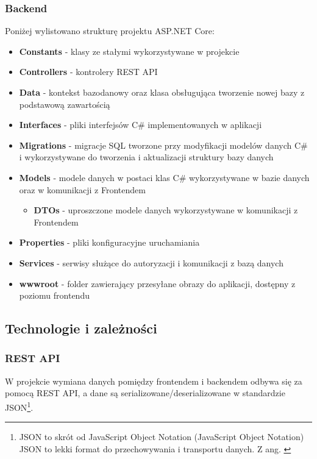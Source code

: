 \subsubsection{Backend}
Poniżej wylistowano strukturę projektu ASP.NET Core:
\begin{itemize}
	\item \textbf{Constants} - klasy ze stałymi wykorzystywane w projekcie
	\item \textbf{Controllers} - kontrolery REST API
	\item \textbf{Data} - kontekst bazodanowy oraz klasa obsługująca tworzenie nowej bazy z podstawową zawartością
	\item \textbf{Interfaces} - pliki interfejsów C\# implementowanych w aplikacji
	\item \textbf{Migrations} - migracje SQL tworzone przy modyfikacji modelów danych C\# i wykorzystywane do tworzenia i aktualizacji struktury bazy danych
	\item \textbf{Models} - modele danych w postaci klas C\# wykorzystywane w bazie danych oraz w komunikacji z Frontendem
		\begin{itemize}
			\item \textbf{DTOs} - uproszczone modele danych wykorzystywane w komunikacji z Frontendem
		\end{itemize}
	\item \textbf{Properties} - pliki konfiguracyjne uruchamiania
	\item \textbf{Services} - serwisy służące do autoryzacji i komunikacji z bazą danych
	\item \textbf{wwwroot} - folder zawierający przesyłane obrazy do aplikacji, dostępny z poziomu frontendu
\end{itemize}

\subsection{Technologie i zależności}

\subsubsection{REST API}
W projekcie wymiana danych pomiędzy frontendem i backendem odbywa się za pomocą REST API, a dane są serializowane/deserializowane w standardzie JSON\footnote{JSON to skrót od JavaScript Object Notation (JavaScript Object Notation) JSON to lekki format do przechowywania i transportu danych. Z ang. \cite{w3s_json}}.

